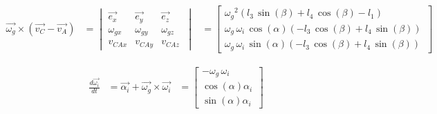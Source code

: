 \begin{equation*}
\begin{split}
\overrightarrow{\omega_{g}}\times(\overrightarrow{v_{C}}-\overrightarrow{v_{A}})
&=	\begin{vmatrix}
	\overrightarrow{e_{x}} & \overrightarrow{e_{y}} & \overrightarrow{e_{z}}\\
	\omega_{gx} & \omega_{gy} & \omega_{gz}\\
	v_{CAx} & v_{CAy} & v_{CAz}\
	\end{vmatrix}
&=	\begin{bmatrix}
	{\omega_{g}}^{2} \left( l_{3}\,\sin \left( \beta \right) +l_{4}\,\cos \left( \beta \right) -l_{1} \right) \\
	\omega_{g}\,\omega_{i}\,\cos \left( \alpha\right)  \left( -l_{3}\,\cos \left( \beta \right) +l_{4}\,\sin\left( \beta \right)  \right) \\
	\omega_{g}\,\omega_{i}\,\sin \left( \alpha \right)  \left( -l_{3}\,\cos \left( \beta\right) +l_{4}\,\sin \left( \beta \right)  \right)\
	\end{bmatrix}
\end{split}
\end{equation*}

\begin{equation*}
\begin{split}
\frac{d\overrightarrow{\omega_i}}{dt}
&=	\overrightarrow{\alpha_{i}}+\overrightarrow{\omega_{g}}\times\overrightarrow{\omega_{i}}
&=	\begin{bmatrix}
	-\omega_{g}\,\omega_{i}\\
	\cos \left( \alpha \right) \alpha_{i}\\
	\sin \left( \alpha \right) \alpha_{i}\
	\end{bmatrix}
\end{split}
\end{equation*}

